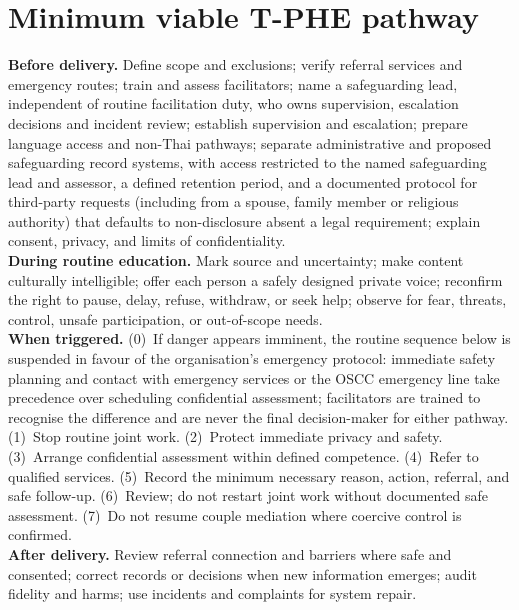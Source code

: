\documentclass[10pt,twocolumn]{article}
\newcommand{\tphe}{T\mbox{-}PHE}
\begin{document}
\section{Minimum viable \tphe{} pathway}
\footnotesize
\textbf{Before delivery.} Define scope and exclusions; verify referral services and emergency routes; train and assess facilitators; name a safeguarding lead, independent of routine facilitation duty, who owns supervision, escalation decisions and incident review; establish supervision and escalation; prepare language access and non-Thai pathways; separate administrative and proposed safeguarding record systems, with access restricted to the named safeguarding lead and assessor, a defined retention period, and a documented protocol for third-party requests (including from a spouse, family member or religious authority) that defaults to non-disclosure absent a legal requirement; explain consent, privacy, and limits of confidentiality.\\
\textbf{During routine education.} Mark source and uncertainty; make content culturally intelligible; offer each person a safely designed private voice; reconfirm the right to pause, delay, refuse, withdraw, or seek help; observe for fear, threats, control, unsafe participation, or out-of-scope needs.\\
\textbf{When triggered.} (0)~If danger appears imminent, the routine sequence below is suspended in favour of the organisation's emergency protocol: immediate safety planning and contact with emergency services or the OSCC emergency line take precedence over scheduling confidential assessment; facilitators are trained to recognise the difference and are never the final decision-maker for either pathway. (1)~Stop routine joint work. (2)~Protect immediate privacy and safety. (3)~Arrange confidential assessment within defined competence. (4)~Refer to qualified services. (5)~Record the minimum necessary reason, action, referral, and safe follow-up. (6)~Review; do not restart joint work without documented safe assessment. (7)~Do not resume couple mediation where coercive control is confirmed.\\
\textbf{After delivery.} Review referral connection and barriers where safe and consented; correct records or decisions when new information emerges; audit fidelity and harms; use incidents and complaints for system repair.
\end{document}
